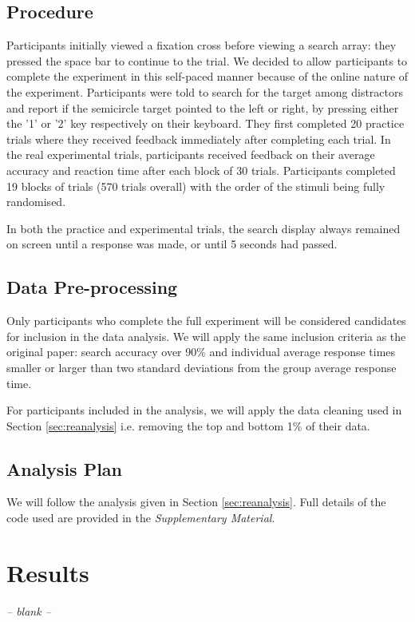 \documentclass[smallextended, natbib]{svjour3}       %
\begin{document}
\subsection{Procedure}

Participants initially viewed a fixation cross before viewing a search array: they pressed the space bar to continue to the trial. We decided to allow participants to complete the experiment in this self-paced manner because of the online nature of the experiment. Participants were told to search for the target among distractors and report if the semicircle target pointed to the left or right, by pressing either the '1' or '2' key respectively on their keyboard. They first completed 20 practice trials where they received feedback immediately after completing each trial. In the real experimental trials, participants received feedback on their average accuracy and reaction time after each block of 30 trials. Participants  completed 19 blocks of trials (570 trials overall) with the order of the stimuli being fully randomised.
 
In both the practice and experimental trials, the search display always remained on screen until a response was made, or until 5 seconds had passed. 

\subsection{Data Pre-processing}

Only participants who complete the full experiment will be considered candidates for inclusion in the data analysis. We will apply the same inclusion criteria as the original paper: search accuracy over 90\% and individual average response times smaller or larger than two standard deviations from the group average response time. 

For participants included in the analysis, we will apply the data cleaning used in Section \ref{sec:reanalysis} i.e. removing the top and bottom 1\% of their data.

\subsection{Analysis Plan}

We will follow the analysis given in Section \ref{sec:reanalysis}. Full details of the code used are provided in the \textit{Supplementary Material}.


\section{Results}
\begin{center}
\textit{-- blank --}
\end{center}
\end{document}
